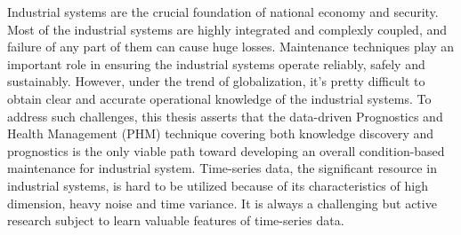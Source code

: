 
\begin{eabstract}
Industrial systems are the crucial foundation of national economy and security. 
Most of the industrial systems are highly integrated and complexly coupled, and failure of any part of them can cause huge losses.  
 Maintenance techniques play an important role in ensuring the industrial systems operate reliably, safely and sustainably. 
However, under the trend of globalization, it’s pretty difficult to obtain clear and accurate operational knowledge of the industrial systems. 
To address such challenges, this thesis asserts that the data-driven Prognostics and Health Management (PHM) technique covering both knowledge discovery and prognostics is the only viable path toward developing an overall condition-based maintenance for industrial system.
Time-series data, the significant resource in industrial systems, is hard to be utilized because of its characteristics of high dimension, heavy noise and time variance.  It is always a challenging but active research subject to learn valuable features of time-series data.


\end{eabstract}
